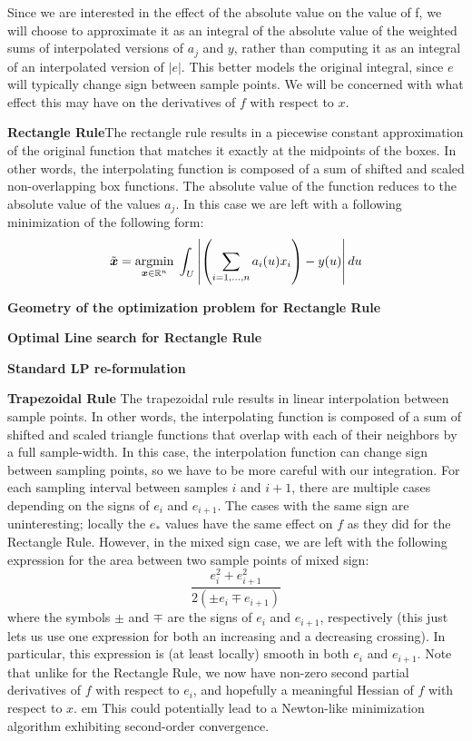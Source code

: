 \documentclass[12pt,journal,draftcls,letterpaper,onecolumn]{IEEEtran}
\begin{document}
Since we are interested in the effect of the absolute value on the value of f, we will choose to approximate it as an integral of the absolute value of the weighted sums of interpolated versions of $a_j$ and $y$, rather than computing it as an integral of an interpolated version of $|e|$.  This better models the original integral, since $e$ will typically change sign between sample points.  We will be concerned with what effect this may have on the derivatives of $f$ with respect to $x$.

{\bf Rectangle Rule}The rectangle rule results in a piecewise constant approximation of the original function that matches it exactly at the midpoints of the boxes. In other words, the interpolating function is composed of a sum of shifted and scaled non-overlapping box functions.  The absolute value of the function reduces to the absolute value of the values $a_j$.  In this case we are left with a following minimization of the following form:
\begin{equation}\label{eqn:discrete1DBox}
\tilde{{\boldsymbol{x}}} = {\hbox{$\underset{{\boldsymbol{x}}\in \mathbb R^n}{\mbox{argmin}}\;$}} \int_U{ \left|\left(\sum_{i=1,\ldots,n} a_i(u) x_i\right) - y(u)\right| du}
\end{equation}

{\bf Geometry of the optimization problem for Rectangle Rule}

{\bf Optimal Line search for Rectangle Rule}

{\bf Standard LP re-formulation}

{\bf Trapezoidal Rule}  The trapezoidal rule results in linear interpolation between sample points.  In other words, the interpolating function is composed of a sum of shifted and scaled triangle functions that overlap with each of their neighbors by a full sample-width.  In this case, the interpolation function can change sign between sampling points, so we have to be more careful with our integration.  For each sampling interval between samples $i$ and $i+1$, there are multiple cases depending on the signs of $e_i$ and $e_{i+1}$.  The cases with the same sign are uninteresting; locally the $e_*$ values have the same effect on $f$ as they did for the Rectangle Rule.  However, in the mixed sign case, we are left with the following expression for the area between two sample points of mixed sign:
\begin{equation}\label{eqn:trapezoid_smoothing}
 \frac{e_i^2 + e_{i+1}^2}{2(\pm e_i \mp e_{i+1})}
\end{equation}
where the symbols $\pm$ and $\mp$ are the signs of $e_i$ and $e_{i+1}$, respectively (this just lets us use one expression for both an increasing and a decreasing crossing).  In particular, this expression is (at least locally) smooth in both $e_i$ and $e_{i+1}$.  Note that unlike for the Rectangle Rule, we now have non-zero second partial derivatives of $f$ with respect to $e_i$, and hopefully a meaningful Hessian of $f$ with respect to $x$.  {em This could potentially lead to a Newton-like minimization algorithm exhibiting second-order convergence}.  
\end{document}
